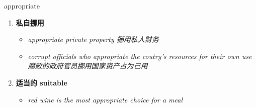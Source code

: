 
\begin{frame}
{\huge appropriate}
\begin{center}
\begin{enumerate}\Large
  \item \textbf{私自挪用}
  \begin{itemize}
    \item \em{\Large{appropriate private property 挪用私人财务}}
    \item \em{\Large{corrupt officials who appropriate the coutry's resources for their own use 腐败的政府官员挪用国家资产占为己用}}
  \end{itemize}
  \item \textbf{适当的 suitable}
  \begin{itemize}
    \item \em{\Large{red wine is the most appropriate choice for a meal}}
  \end{itemize}
\end{enumerate}
\end{center}
\end{frame}
